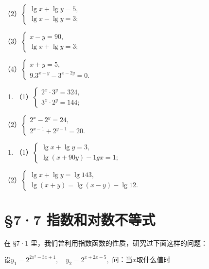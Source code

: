 （2）\(\left\{ \begin{array}{l} \lg x + \lg y = 5, \\ \lg x - \lg y = 3; \end{array} \right.\)

（3）\(\left\{ \begin{array}{l} x - y = 90, \\ \lg x + \lg y = 3; \end{array} \right.\)

（4）\(\left\{ \begin{array}{l} x + y = 5, \\ 9.3^{x + y} - 3^{x - 2y} = 0. \end{array} \right.\)

\begin{enumerate}[start=2]
\item
  （1）\(\left\{ \begin{array}{l} 2^x \cdot 3^y = 324, \\ 3^x \cdot 2^y = 144; \end{array} \right.\)
\end{enumerate}

（2）\(\left\{ \begin{array}{l} 2^{x} - 2^{y} = 24, \\ 2^{x - 1} + 2^{y - 1} = 20. \end{array} \right.\)

\begin{enumerate}[start=3]
\item
  （1）\(\left\{ \begin{array}{l} \lg x + \lg y = 3, \\ \lg (x + 90y) - 1g x = 1; \end{array} \right.\)
\end{enumerate}

（2）\(\left\{ \begin{array}{l} \lg x + \lg y = \lg 143, \\ \lg (x + y) = \lg (x - y) - \lg 12. \end{array} \right.\)

\section{§7·7 指数和对数不等式}

在 §7·1 里，我们曾利用指数函数的性质，研究过下面这样的问题：

设\(y_{1} = 2^{2x^{2} - 3x + 1},\quad y_{2} = 2^{x + 2x - 5},\)
问：当\(x\)取什么值时

